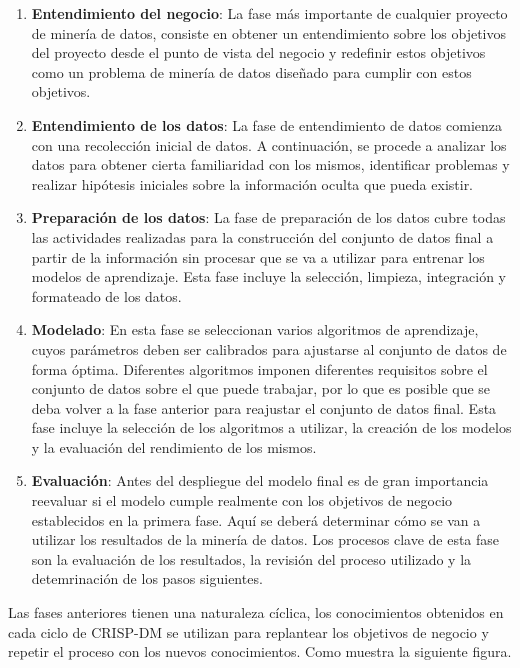 \begin{enumerate}
    \item \textbf{Entendimiento del negocio}: La fase más importante de
    cualquier proyecto de minería de datos, consiste en obtener un entendimiento
    sobre los objetivos del proyecto desde el punto de vista del negocio y
    redefinir estos objetivos como un problema de minería de datos diseñado para
    cumplir con estos objetivos.
    \item \textbf{Entendimiento de los datos}: La fase de entendimiento de datos
    comienza con una recolección inicial de datos. A continuación, se procede a
    analizar los datos para obtener cierta familiaridad con los mismos,
    identificar problemas y realizar hipótesis iniciales sobre la información
    oculta que pueda existir.
    \item \textbf{Preparación de los datos}: La fase de preparación de los datos
    cubre todas las actividades realizadas para la construcción del conjunto de
    datos final a partir de la información sin procesar que se va a utilizar
    para entrenar los modelos de aprendizaje. Esta fase incluye la selección,
    limpieza, integración y formateado de los datos.
    \item \textbf{Modelado}: En esta fase se seleccionan varios algoritmos de
    aprendizaje, cuyos parámetros deben ser calibrados para ajustarse al
    conjunto de datos de forma óptima. Diferentes algoritmos imponen diferentes
    requisitos sobre el conjunto de datos sobre el que puede trabajar, por lo
    que es posible que se deba volver a la fase anterior para reajustar el
    conjunto de datos final. Esta fase incluye la selección de los algoritmos a
    utilizar, la creación de los modelos y la evaluación del rendimiento de los
    mismos.
    \item \textbf{Evaluación}: Antes del despliegue del modelo final es de gran
    importancia reevaluar si el modelo cumple realmente con los objetivos de
    negocio establecidos en la primera fase. Aquí se deberá determinar cómo se
    van a utilizar los resultados de la minería de datos. Los procesos clave de
    esta fase son la evaluación de los resultados, la revisión del proceso
    utilizado y la detemrinación de los pasos siguientes.
\end{enumerate}

Las fases anteriores tienen una naturaleza cíclica, los conocimientos obtenidos
en cada ciclo de CRISP-DM se utilizan para replantear los objetivos de negocio y
repetir el proceso con los nuevos conocimientos. Como muestra la siguiente
figura.

